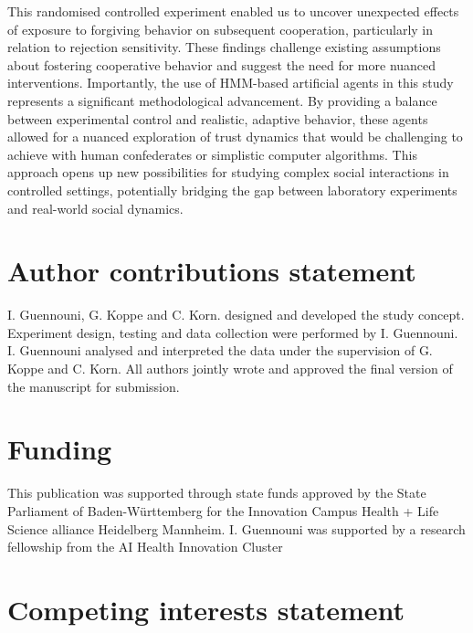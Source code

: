 \documentclass[
]{article}
\begin{document}
This randomised controlled experiment enabled us to uncover unexpected effects of exposure to forgiving behavior on subsequent cooperation, particularly in relation to rejection sensitivity. These findings challenge existing assumptions about fostering cooperative behavior and suggest the need for more nuanced interventions. Importantly, the use of HMM-based artificial agents in this study represents a significant methodological advancement. By providing a balance between experimental control and realistic, adaptive behavior, these agents allowed for a nuanced exploration of trust dynamics that would be challenging to achieve with human confederates or simplistic computer algorithms. This approach opens up new possibilities for studying complex social interactions in controlled settings, potentially bridging the gap between laboratory experiments and real-world social dynamics.

\pagebreak

\section*{Author contributions statement}\label{author-contributions-statement}

I. Guennouni, G. Koppe and C. Korn. designed and developed the study concept. Experiment design, testing and data collection were performed by I. Guennouni. I. Guennouni analysed and interpreted the data under the supervision of G. Koppe and C. Korn. All authors jointly wrote and approved the final version of the manuscript for submission.

\section*{Funding}\label{funding}

This publication was supported through state funds approved by the State Parliament of Baden-Württemberg for the Innovation Campus Health + Life Science alliance Heidelberg Mannheim. I. Guennouni was supported by a research fellowship from the AI Health Innovation Cluster

\section*{Competing interests statement}\label{competing-interests-statement}
\end{document}
